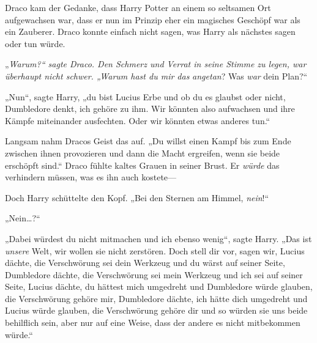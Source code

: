 Draco kam der Gedanke, dass Harry Potter an einem so seltsamen Ort aufgewachsen war, dass er nun im Prinzip eher ein magisches Geschöpf war als ein Zauberer. Draco konnte einfach nicht sagen, was Harry als nächstes sagen oder tun würde.

„\emph{Warum?“ sagte Draco. Den Schmerz und Verrat in seine Stimme zu legen, war überhaupt nicht schwer. „Warum hast du mir das} \emph{angetan}? Was \emph{war} dein Plan?“

„Nun“, sagte Harry, „du bist Lucius Erbe und ob du es glaubst oder nicht, Dumbledore denkt, ich gehöre zu ihm. Wir könnten also aufwachsen und ihre Kämpfe miteinander ausfechten. Oder wir könnten etwas anderes tun.“

Langsam nahm Dracos Geist das auf. „Du willst einen Kampf bis zum Ende zwischen ihnen provozieren und dann die Macht ergreifen, wenn sie beide erschöpft sind.“ Draco fühlte kaltes Grauen in seiner Brust. Er \emph{würde} das verhindern müssen, was es ihn auch kostete—

Doch Harry schüttelte den Kopf. „Bei den Sternen am Himmel, \emph{nein}!“

„Nein…?“

„Dabei würdest du nicht mitmachen und ich ebenso wenig“, sagte Harry. „Das ist \emph{unsere} Welt, wir wollen sie nicht zerstören. Doch stell dir vor, sagen wir, Lucius dächte, die Verschwörung sei dein Werkzeug und du wärst auf seiner Seite, Dumbledore dächte, die Verschwörung sei mein Werkzeug und ich sei auf seiner Seite, Lucius dächte, du hättest mich umgedreht und Dumbledore würde glauben, die Verschwörung gehöre mir, Dumbledore dächte, ich hätte dich umgedreht und Lucius würde glauben, die Verschwörung gehöre dir und so würden sie uns beide behilflich sein, aber nur auf eine Weise, dass der andere es nicht mitbekommen würde.“

